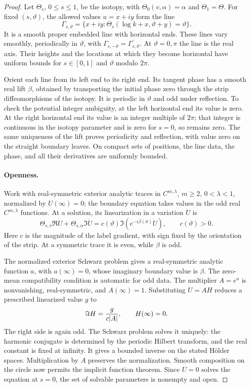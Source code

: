\begin{proof}
Let $\Theta_s$, $0\le s\le1$, be the isotopy, with $\Theta_0(v,\alpha)=\alpha$
and $\Theta_1=\Theta$.  For fixed $(s,\vartheta)$, the allowed values
$u=x+iy$ form the line
\[
 \Gamma_{s,\vartheta}
 =\{x+iy:\Theta_s(\log k+x,\vartheta+y)=\vartheta\}.
\]
It is a smooth proper embedded line with horizontal ends.  These lines
vary smoothly, periodically in $\vartheta$, with
$\Gamma_{s,-\vartheta}=\overline{\Gamma_{s,\vartheta}}$.
At $\vartheta=0,\pi$ the line is the real axis.  Their heights and the
locations at which they become horizontal have uniform bounds for
$s\in[0,1]$ and $\vartheta$ modulo $2\pi$.

Orient each line from its left end to its right end.  Its tangent phase
has a smooth real lift $\beta$, obtained by transporting the initial
phase zero through the strip diffeomorphisms of the isotopy.  It is
periodic in $\vartheta$ and odd under reflection.  To check the
potential integer ambiguity, at the left horizontal end its value is
zero.  At the right horizontal end its value is an integer multiple of
$2\pi$; that integer is continuous in the isotopy parameter and is zero
for $s=0$, so remains zero.  The same uniqueness of the lift proves
periodicity and reflection, with value zero on the straight boundary
leaves.  On compact sets of positions, the line data, the phase, and
all their derivatives are uniformly bounded.

\paragraph{Openness.}
Work with real-symmetric exterior analytic traces in $C^{m,\lambda}$,
$m\ge2$, $0<\lambda<1$, normalized by $U(\infty)=0$; the boundary equation
takes values in the odd real $C^{m,\lambda}$ functions.  At a solution,
its linearization in a variation $\dot U$ is
\[
 \Theta_{s,v}\Re\dot U+\Theta_{s,\alpha}\Im\dot U
   =c(\vartheta)\Im(e^{-i\beta(\vartheta)}\dot U),
 \qquad c(\vartheta)>0.
\]
Here $c$ is the magnitude of the label gradient, with sign fixed by the
orientation of the strip.  At a symmetric trace it is even, while
$\beta$ is odd.

The normalized exterior Schwarz problem gives a real-symmetric analytic
function $a$, with $a(\infty)=0$, whose imaginary boundary value is
$\beta$.  The zero-mean compatibility condition is automatic for odd
data.  The multiplier $A=e^a$ is nonvanishing, real-symmetric, and
$A(\infty)=1$.  Substituting $\dot U=AH$ reduces a prescribed
linearized value $g$ to
\[
 \Im H=\frac{g}{c\lvert A\rvert},\qquad H(\infty)=0.
\]
The right side is again odd.  The Schwarz problem solves it uniquely:
the harmonic conjugate is determined by the periodic Hilbert transform,
and the real constant is fixed at infinity.  It gives a bounded inverse
on the stated H\"older spaces.  Multiplication by $A$ preserves the
normalization.  Smooth composition on the circle now permits the
implicit function theorem.  Since $U=0$ solves the equation at $s=0$,
the set of solvable parameters is nonempty and open.


\end{proof}
